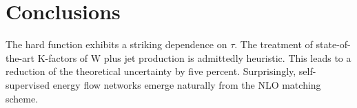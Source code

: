 \section{Conclusions}\label{sec:conclusions}

The hard function exhibits a striking dependence on $\tau$. The
treatment of state-of-the-art K-factors of W plus jet production is
admittedly heuristic. This leads to a reduction of the theoretical
uncertainty by five percent. Surprisingly, self-supervised energy flow
networks emerge naturally from the NLO matching scheme.

